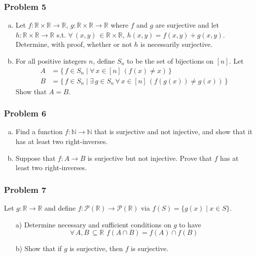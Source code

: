 \newpage\documentclass[11pt,onecolumn,fleqn]{article}
\theoremstyle{definition}
\def\fall#1{\forall\, {#1}\,}
\def\fex#1{\exists \,{#1}\,}
\def\set#1#2{\{\, {#1} \mid {#2}\,\}}
\begin{document}
\newpage

\subsubsection*{Problem 5}
\begin{enumerate}[(a)]
    \item Let $f: \mathbb{R} \times \mathbb{R} \rightarrow \mathbb{R}$, $g: \mathbb{R} \times \mathbb{R} \rightarrow \mathbb{R}$ where $f$ and $g$ are surjective and let $h: \mathbb{R} \times \mathbb{R} \rightarrow \mathbb{R}$ s.t. $\fall{(x, y)} \in \mathbb{R} \times \mathbb{R},\ h(x, y) = f(x, y) + g(x, y)$. Determine, with proof, whether or not $h$ is necessarily surjective.
    \item For all positive integers $n$, define $S_n$ to be the set of bijections on $[n]$. Let
    \begin{align*}
      A &= \set{ f \in S_{n}}{ \fall{x \in [n]}( f(x) \neq x )} \\
      B &=  \set{ f \in S_{n}}{ \fex{g \in S_{n}} \fall{x \in [n]}( f(g(x)) \neq g(x) )}
    \end{align*}
    Show that $A = B$.
\end{enumerate}


\subsubsection*{Problem 6}
\begin{enumerate}[(a)]
    \item Find a function $f:\mathbb{N}\rightarrow\mathbb{N}$ that is surjective and not injective, and show that it has at least two right-inverses.
    \item Suppose that $f:A\rightarrow B$ is surjective but not injective. Prove that $f$ has at least two right-inverses.
\end{enumerate}


\subsubsection*{Problem 7}
Let $g : \mathbb{R} \rightarrow \mathbb{R}$ and define $f : \mathcal{P}(\mathbb{R}) \rightarrow \mathcal{P}(\mathbb{R})$ via $f(S) = \{g(x) \mid x \in S\}$. 

\begin{enumerate}
\item[a)] Determine necessary and sufficient conditions on $g$ to have
\begin{equation*}
    \fall{A, B} \subseteq \mathbb{R} \, \  f(A \cap B) = f(A) \cap f(B)
\end{equation*}

\item[b)] Show that if $g$ is surjective, then $f$ is surjective. 
\end{enumerate}
\end{document}

